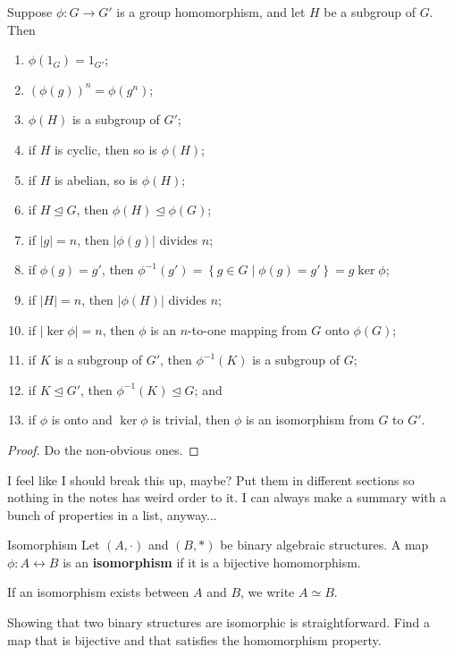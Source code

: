 \documentclass[10pt]{report}
\begin{document}
\begin{prop}
Suppose $\phi:G\to G'$ is a group homomorphism, and let $H$ be a subgroup of $G$. Then
\begin{enumerate}
	\item $\phi(1_G)=1_{G'}$;
	\item $(\phi(g))^n = \phi(g^n)$;
	\item $\phi(H)$ is a subgroup of $G'$;
	\item if $H$ is cyclic, then so is $\phi(H)$;
	\item if $H$ is abelian, so is $\phi(H)$;
	\item if $H \trianglelefteq G$, then $\phi(H) \trianglelefteq \phi(G)$;
	\item if $|g|=n$, then $|\phi(g)|$ divides $n$;
	\item if $\phi(g)=g'$, then $\phi^{-1}(g') = \left\{ g\in G\;|\; \phi(g)=g' \right\} = g \ker \phi$;
	\item if $|H| = n$, then $|\phi(H)|$ divides $n$;
	\item if $|\ker \phi| = n$, then $\phi$ is an $n$-to-one mapping from $G$ onto $\phi(G)$;
	\item if $K$ is a subgroup of $G'$, then $\phi^{-1}(K)$ is a subgroup of $G$;
	\item if $ K \trianglelefteq G'$, then $\phi^{-1}(K) \trianglelefteq G$; and
	\item if $\phi$ is onto and $\ker \phi$ is trivial, then $\phi$ is an isomorphism from $G$ to $G'$.
\end{enumerate}
\end{prop}
\begin{proof}
{\color{red}Do the non-obvious ones.}
\end{proof}

{\color{red}I feel like I should break this up, maybe? Put them in different sections so nothing in the notes has weird order to it. I can always make a summary with a bunch of properties in a list, anyway...}

\begin{defn}{Isomorphism}{}
Let $(A, \cdot)$ and $(B,*)$ be binary algebraic structures. A map $\phi:A \leftrightarrow B$ is an \textbf{isomorphism} if it is a bijective homomorphism.

If an isomorphism exists between $A$ and $B$, we write $A \simeq B$.
\end{defn}

Showing that two binary structures are isomorphic is straightforward. Find a map that is bijective and that satisfies the homomorphism property.
\end{document}
